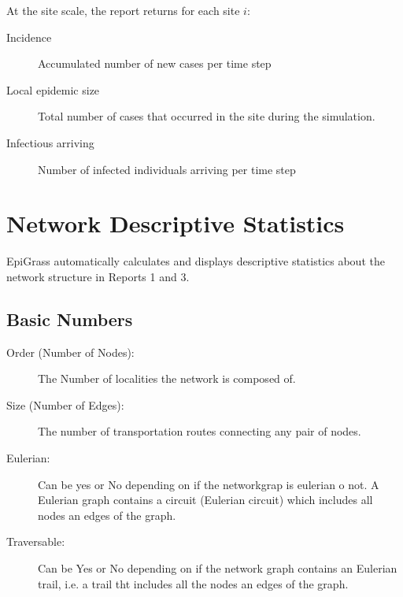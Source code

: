 At the site scale, the report returns for each site $i$:
\begin{description}
\item[Incidence] Accumulated number of new cases per time step
\item[Local epidemic size] Total number of cases that occurred in the site during the simulation.
\item[Infectious arriving] Number of infected individuals arriving per time step


\end{description}

\section{Network Descriptive Statistics}
EpiGrass automatically calculates and displays descriptive statistics about the network structure in Reports 1 and 3.
\subsection{Basic Numbers}
       \begin{description}
        \item[Order (Number of Nodes):] The Number of localities the network is composed of.
        \item[Size (Number of Edges):] The number of transportation routes connecting any pair of nodes. 
	\item [Eulerian:] Can be yes or No depending on if the networkgrap is eulerian o not. A Eulerian graph contains a circuit (Eulerian circuit) which includes all nodes an edges of the graph.
	\item [Traversable:]Can be Yes or No depending on if the network graph contains an Eulerian trail, i.e. a trail tht includes all the nodes an edges of the graph.   
        \end{description}
        
